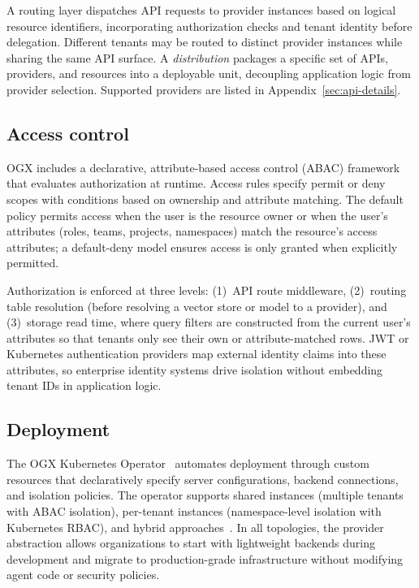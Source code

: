 \documentclass[sigconf]{acmart}
\begin{document}
A routing layer dispatches API requests to provider instances based on logical resource identifiers, incorporating authorization checks and tenant identity before delegation. Different tenants may be routed to distinct provider instances while sharing the same API surface. A \emph{distribution} packages a specific set of APIs, providers, and resources into a deployable unit, decoupling application logic from provider selection. Supported providers are listed in Appendix~\ref{sec:api-details}.

\subsection{Access control}
\label{sec:access-control}

OGX includes a declarative, attribute-based access control (ABAC) framework that evaluates authorization at runtime. Access rules specify permit or deny scopes with conditions based on ownership and attribute matching. The default policy permits access when the user is the resource owner or when the user's attributes (roles, teams, projects, namespaces) match the resource's access attributes; a default-deny model ensures access is only granted when explicitly permitted.

Authorization is enforced at three levels: (1)~API route middleware, (2)~routing table resolution (before resolving a vector store or model to a provider), and (3)~storage read time, where query filters are constructed from the current user's attributes so that tenants only see their own or attribute-matched rows. JWT or Kubernetes authentication providers map external identity claims into these attributes, so enterprise identity systems drive isolation without embedding tenant IDs in application logic.

\subsection{Deployment}
\label{sec:deployment}

The OGX Kubernetes Operator~\cite{ogxk8soperator} automates deployment through custom resources that declaratively specify server configurations, backend connections, and isolation policies. The operator supports shared instances (multiple tenants with ABAC isolation), per-tenant instances (namespace-level isolation with Kubernetes RBAC), and hybrid approaches~\cite{burns2016borg}. In all topologies, the provider abstraction allows organizations to start with lightweight backends during development and migrate to production-grade infrastructure without modifying agent code or security policies.
\end{document}
